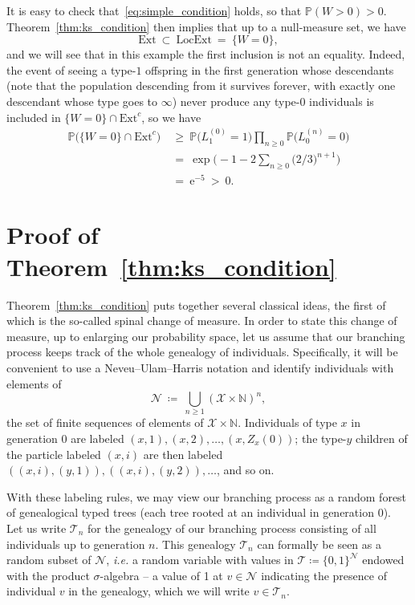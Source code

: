 \begin{refsegment}
It is easy to check that~\eqref{eq:simple_condition} holds, so that $\mathbb{P}(W>0)>0$.
Theorem~\ref{thm:ks_condition} then implies that up to a null-measure set, we have
\[
  \mathrm{Ext}\ \subset\ \mathrm{LocExt}\ =\ \{W=0\},
\]
and we will see that in this example the first inclusion is not an equality.
Indeed, the event of seeing a type-$1$ offspring in the first generation whose descendants (note that the population descending from it survives forever, with exactly one descendant whose type goes to $\infty$) never produce any type-$0$ individuals is included in $\{W=0\}\cap\mathrm{Ext}^c$, so we have
\begin{align*}
  \mathbb{P}\big(\{W=0\}\cap \mathrm{Ext}^c\big)\ &\geq\ \mathbb{P}\big(L^{(0)}_1=1\big) \prod_{n\geq 0} \mathbb{P}\big( L^{(n)}_{0}=0\big)\\
  &=\ \exp\Big(-1 - 2\sum_{n\geq 0} \big(2/3\big)^{n+1}\Big)\\
  &=\ \mathrm{e}^{-5}\ >\ 0.
\end{align*}


\section{Proof of Theorem~\ref{thm:ks_condition}}
\label{ch2_sec:proof_ks_results}

Theorem~\ref{thm:ks_condition} puts together several classical ideas, the first of which is the so-called spinal change of measure.
In order to state this change of measure, up to enlarging our probability space, let us assume that our branching process keeps track of the whole genealogy of individuals.
Specifically, it will be convenient to use a Neveu--Ulam--Harris notation and identify individuals with elements of
\[
\mathcal{N}\ \coloneqq\ \bigcup_{n\geq 1}(\mathcal{X}\times\mathbb{N})^{n},
\] 
the set of finite sequences of elements of $\mathcal{X}\times\mathbb{N}$.
Individuals of type $x$ in generation 0 are labeled $(x,1),(x,2),\dots,(x,Z_x(0))$; the type-$y$ children of the particle labeled $(x,i)$ are then labeled $((x,i),(y,1)),((x,i),(y,2)),\ldots$, and so on.

With these labeling rules, we may view our branching process as a random forest of genealogical typed trees (each tree rooted at an individual in generation 0).
Let us write $\mathcal{T}_{ n}$ for the genealogy of our branching process consisting of all individuals up to generation $n$.
This genealogy $\mathcal{T}_{ n}$ can formally be seen as a random subset of $\mathcal{N}$, \textit{i.e.} a random variable with values in $\mathscr{T}\coloneqq\{0,1\}^{\mathcal{N}}$ endowed with the product $\sigma$-algebra -- a value of 1 at $v\in \mathcal{N}$ indicating the presence of individual $v$ in the genealogy, which we will write $v\in \mathcal{T}_{ n}$.


\end{refsegment}
